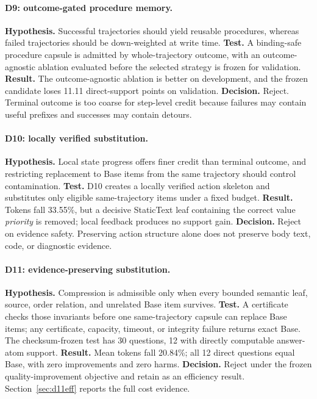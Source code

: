 \documentclass[10pt]{article}
\begin{document}
\paragraph{D9: outcome-gated procedure memory.}
\textbf{Hypothesis.} Successful trajectories should yield reusable procedures, whereas failed trajectories should be down-weighted at write time. \textbf{Test.} A binding-safe procedure capsule is admitted by whole-trajectory outcome, with an outcome-agnostic ablation evaluated before the selected strategy is frozen for validation. \textbf{Result.} The outcome-agnostic ablation is better on development, and the frozen candidate loses 11.11 direct-support points on validation. \textbf{Decision.} Reject. Terminal outcome is too coarse for step-level credit because failures may contain useful prefixes and successes may contain detours.

\paragraph{D10: locally verified substitution.}
\textbf{Hypothesis.} Local state progress offers finer credit than terminal outcome, and restricting replacement to Base items from the same trajectory should control contamination. \textbf{Test.} D10 creates a locally verified action skeleton and substitutes only eligible same-trajectory items under a fixed budget. \textbf{Result.} Tokens fall 33.55\%, but a decisive StaticText leaf containing the correct value \emph{priority} is removed; local feedback produces no support gain. \textbf{Decision.} Reject on evidence safety. Preserving action structure alone does not preserve body text, code, or diagnostic evidence.

\paragraph{D11: evidence-preserving substitution.}
\textbf{Hypothesis.} Compression is admissible only when every bounded semantic leaf, source, order relation, and unrelated Base item survives. \textbf{Test.} A certificate checks those invariants before one same-trajectory capsule can replace Base items; any certificate, capacity, timeout, or integrity failure returns exact Base. The checksum-frozen test has 30 questions, 12 with directly computable answer-atom support. \textbf{Result.} Mean tokens fall 20.84\%; all 12 direct questions equal Base, with zero improvements and zero harms. \textbf{Decision.} Reject under the frozen quality-improvement objective and retain as an efficiency result. Section~\ref{sec:d11eff} reports the full cost evidence.
\end{document}
